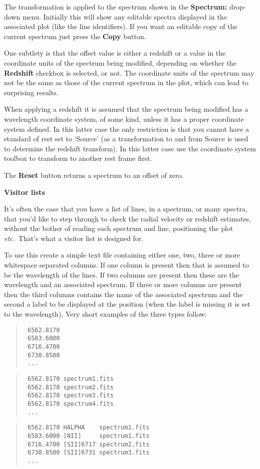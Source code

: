 \documentclass[twoside,11pt]{article}
\renewcommand{\_}{\texttt{\symbol{95}}}
\newcommand{\labelitem}[1]{\textbf{#1}}
\newcommand{\etc}{\textit{etc.}}
\newcommand{\subheading}[1]{\textbf{\large{#1}}}
\begin{document}
The transformation is applied to the spectrum shown in the
\labelitem{Spectrum:} drop-down menu. Initially this will show any editable
spectra displayed in the associated plot (like the line identifiers).
If you want an editable copy of the current spectrum just press the
\labelitem{Copy} button.

One subtlety is that the offset value is either a redshift or a value in the
coordinate units of the spectrum being modified, depending on whether the
\labelitem{Redshift} checkbox is selected, or not. The coordinate units of
the spectrum may not be the same as those of the current spectrum in the plot,
which can lead to surprising results.

When applying a redshift it is assumed that the spectrum being modified has a
wavelength coordinate system, of some kind, unless it has a proper coordinate
system defined. In this latter case the only restriction is that you cannot
have a standard of rest set to `Source' (as a transformation to and from
Source is used to determine the redshift transform). In this latter case use
the coordinate system toolbox to transform to another rest frame first.

The \labelitem{Reset} button returns a spectrum to an offset of zero.

\subheading{Visitor lists}

It's often the case that you have a list of lines, in a spectrum, or many
spectra, that you'd like to step through to check the radial velocity or
redshift estimates, without the bother of reading each spectrum and line,
positioning the plot \etc\ That's what a visitor list is designed for.

To use this create a simple text file containing either one, two, three
or more whitespace separated columns. If one column is present then that is
assumed to be the wavelength of the lines. If two columns are present then
these are the wavelength and an associated spectrum. If three or more columns
are present then the third columns contains the name of the associated
spectrum and the second a label to be displayed at the position (when the
label is missing it is set to the wavelength). Very short examples of the
three types follow:

\begin{quote}
\begin{verbatim}
 6562.8170
 6583.6000
 6716.4700
 6730.8500
 ...
\end{verbatim}
\end{quote}
\begin{quote}
\begin{verbatim}
 6562.8170 spectrum1.fits
 6562.8170 spectrum2.fits
 6562.8170 spectrum3.fits
 6562.8170 spectrum4.fits
 ...
\end{verbatim}
\end{quote}
\begin{quote}
\begin{verbatim}
 6562.8170 HALPHA    spectrum1.fits
 6583.6000 [NII]     spectrum1.fits
 6716.4700 [SII]6717 spectrum2.fits
 6730.8500 [SII]6731 spectrum3.fits
 ...
\end{verbatim}
\end{quote}
\end{document}
